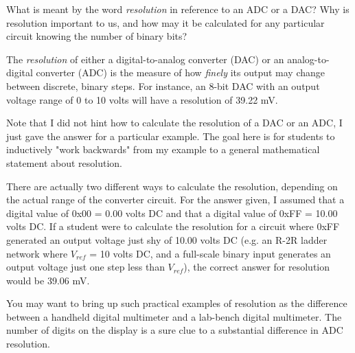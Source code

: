 

What is meant by the word {\it resolution} in reference to an ADC or a DAC?  Why is resolution important to us, and how may it be calculated for any particular circuit knowing the number of binary bits?







The {\it resolution} of either a digital-to-analog converter (DAC) or an analog-to-digital converter (ADC) is the measure of how {\it finely} its output may change between discrete, binary steps.  For instance, an 8-bit DAC with an output voltage range of 0 to 10 volts will have a resolution of 39.22 mV.







Note that I did not hint how to calculate the resolution of a DAC or an ADC, I just gave the answer for a particular example.  The goal here is for students to inductively "work backwards" from my example to a general mathematical statement about resolution.

There are actually two different ways to calculate the resolution, depending on the actual range of the converter circuit.  For the answer given, I assumed that a digital value of 0x00 = 0.00 volts DC and that a digital value of 0xFF = 10.00 volts DC.  If a student were to calculate the resolution for a circuit where 0xFF generated an output voltage just shy of 10.00 volts DC (e.g. an R-2R ladder network where $V_{ref}$ = 10 volts DC, and a full-scale binary input generates an output voltage just one step less than $V_{ref}$), the correct answer for resolution would be 39.06 mV.

You may want to bring up such practical examples of resolution as the difference between a handheld digital multimeter and a lab-bench digital multimeter.  The number of digits on the display is a sure clue to a substantial difference in ADC resolution.




